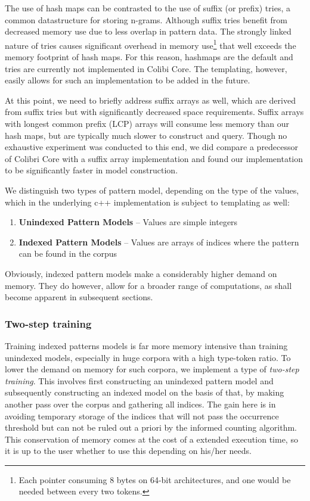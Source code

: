 \documentclass[a4paper,12pt]{article}
\begin{document}
The use of hash maps can be contrasted to the use of suffix (or prefix) tries,
a common datastructure for storing n-grams. Although suffix tries benefit from
decreased memory use due to less overlap in pattern data. The strongly linked
nature of tries causes significant overhead in memory use\footnote{Each pointer
consuming 8 bytes on 64-bit architectures, and one would be needed between
every two tokens.} that well exceeds the memory footprint of hash maps. For
this reason, hashmaps are the default and tries are currently not implemented
in Colibi Core. The templating, however, easily allows for such an
implementation to be added in the future.

At this point, we need to briefly address suffix arrays \citep{Manber90} as well, which
are derived from suffix tries but with significantly decreased space
requirements. Suffix arrays with longest common prefix (LCP) arrays will
consume less memory than our hash maps, but are typically much slower to
construct and query. Though no exhaustive experiment was conducted to this
end, we did compare a predecessor of Colibri Core with a suffix array implementation
\citep{Stehouwer10} and found our implementation to be significantly faster in model
construction.

We distinguish two types of pattern model, depending on the type of the values,
which in the underlying c++ implementation is subject to templating as well:

\begin{enumerate}
 \item \textbf{Unindexed Pattern Models} -- Values are simple integers
 \item \textbf{Indexed Pattern Models} -- Values are arrays of indices where the pattern can be found in the corpus
\end{enumerate}

Obviously, indexed pattern models make a considerably higher demand on memory.
They do however, allow for a broader range of computations, as shall become
apparent in subsequent sections.

\subsubsection{Two-step training}

Training indexed patterns models is far more memory intensive than training
unindexed models, especially in huge corpora with a high type-token ratio. To
lower the demand on memory for such corpora, we implement a type of
\emph{two-step training}. This involves first constructing an unindexed pattern
model and subsequently constructing an indexed model on the basis of that, by
making another pass over the corpus and gathering all indices. The gain here is
in avoiding temporary storage of the indices that will not pass the occurrence
threshold but can not be ruled out a priori by the informed counting algorithm.
This conservation of memory comes at the cost of a extended execution time, so
it is up to the user whether to use this depending on his/her needs.
\end{document}
